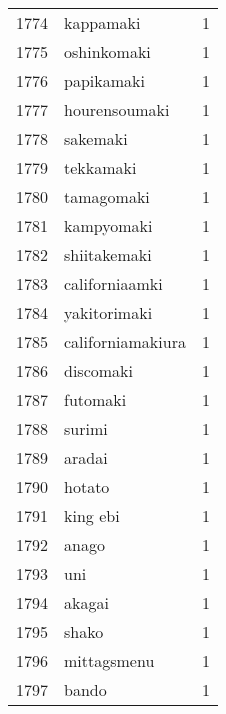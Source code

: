 \begin{tabular}{llr}
1774 &                                          kappamaki &      1 \\
1775 &                                        oshinkomaki &      1 \\
1776 &                                         papikamaki &      1 \\
1777 &                                      hourensoumaki &      1 \\
1778 &                                           sakemaki &      1 \\
1779 &                                          tekkamaki &      1 \\
1780 &                                         tamagomaki &      1 \\
1781 &                                         kampyomaki &      1 \\
1782 &                                       shiitakemaki &      1 \\
1783 &                                     californiaamki &      1 \\
1784 &                                       yakitorimaki &      1 \\
1785 &                                  californiamakiura &      1 \\
1786 &                                          discomaki &      1 \\
1787 &                                           futomaki &      1 \\
1788 &                                             surimi &      1 \\
1789 &                                             aradai &      1 \\
1790 &                                             hotato &      1 \\
1791 &                                           king ebi &      1 \\
1792 &                                              anago &      1 \\
1793 &                                                uni &      1 \\
1794 &                                             akagai &      1 \\
1795 &                                              shako &      1 \\
1796 &                                        mittagsmenu &      1 \\
1797 &                                              bando &      1 \\

\end{tabular}
